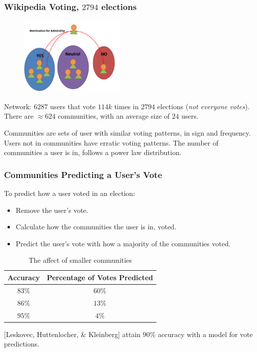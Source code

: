 \documentclass{beamer}
\begin{document}
\begin{frame}\frametitle{Wikipedia Voting, $2794$ elections}
\begin{figure}
\includegraphics[width=2in]{Figures/wiki_votes}
\end{figure}
Network: $6287$ users that vote $114k$ times in $2794$ elections ({\it not everyone votes}).  There are $\approx 624$ communities, with an average size of $24$ users.

Communities are sets of user with similar voting patterns, in sign and frequency.  Users not in communities have erratic voting patterns.  The number of communities a user is in, follows a power law distribution.
\end{frame}


\begin{frame}\frametitle{Communities Predicting a User's Vote}

To predict how a user voted in an election:
\begin{itemize}
\item Remove the user's vote.
\item Calculate how the communities the user is in, voted.
\item Predict the user's vote with how a majority of the communities voted.
\end{itemize}


\begin{table}[t]
\centering
\begin{tabular}{cc}
Accuracy & Percentage of Votes Predicted \\ \hline
 $83\%$ & $60\%$ \\
$86\%$ & $13\%$\\
$95\%$ & $4\%$ 
\end{tabular}
\caption{The affect of smaller communities}
\end{table}

 [Leskovec, Huttenlocher, \& Kleinberg] attain $90 \%$ accuracy with a model for vote predictions.

\end{frame}
\end{document}

